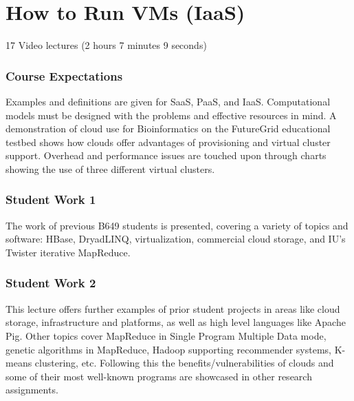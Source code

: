 \part{How to Run VMs (IaaS)}

  17 Video lectures (2 hours 7 minutes 9 seconds)

\section{Course Expectations}

Examples and definitions are given for SaaS, PaaS, and IaaS.
Computational models must be designed with the problems and effective
resources in mind. A demonstration of cloud use for Bioinformatics on
the FutureGrid educational testbed shows how clouds offer advantages of
provisioning and virtual cluster support. Overhead and performance
issues are touched upon through charts showing the use of three
different virtual clusters.



\section{Student Work 1}

The work of previous B649 students is presented, covering a variety of
topics and software: HBase, DryadLINQ, virtualization, commercial cloud
storage, and IU's Twister iterative MapReduce.



\section{Student Work 2}

This lecture offers further examples of prior student projects in areas
like cloud storage, infrastructure and platforms, as well as high level
languages like Apache Pig. Other topics cover MapReduce in Single
Program Multiple Data mode, genetic algorithms in MapReduce, Hadoop
supporting recommender systems, K-means clustering, etc. Following this
the benefits/vulnerabilities of clouds and some of their most well-known
programs are showcased in other research assignments.

